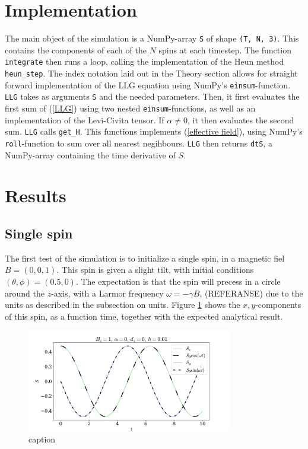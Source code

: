 \documentclass{article}
\begin{document}
    \section*{Implementation}
    The main object of the simulation is a NumPy-array \verb|S| of shape \verb|(T, N, 3)|. This contains the components of each of the $N$ spins at each timestep. The function \verb|integrate| then runs a loop, calling the implementation of the Heun method \verb|heun_step|. The index notation laid out in the Theory section allows for straight forward implementation of the LLG equation using NumPy's \verb|einsum|-function. \verb|LLG| takes as arguments \verb|S| and the needed parameters. Then, it first evaluates the first sum of (\ref{LLG}) using two nested \verb|einsum|-functions, as well as an implementation of the Levi-Civita tensor. If $\alpha \neq 0$, it then evaluates the second sum. \verb|LLG| calls \verb|get_H|. This functions implements (\ref{effective field}), using NumPy's \verb|roll|-function to sum over all nearest negihbours. \verb|LLG| then returns \verb|dtS|, a NumPy-array containing the time derivative of $S$.


    \section*{Results}
    \subsection*{Single spin}
    The first test of the simulation is to initialize a single spin, in a magnetic fiel $B = (0, 0, 1)$. This spin is given a slight tilt, with initial conditions $(\theta, \phi) = (0.5, 0)$. The expectation is that the spin will precess in a circle around the $z$-axis, with a Larmor frequency $\omega = -\gamma B$, (REFERANSE) due to the units as described in the subsection on units. Figure \ref{single spin} shows the $x,y$-components of this spin, as a function time, together with the expected analytical result.

    \begin{figure}
        \centering
        \includegraphics[width=0.8\textwidth]{../plots/single.pdf}
        \caption{caption}
        \label{single spin}
    \end{figure}
\end{document}
